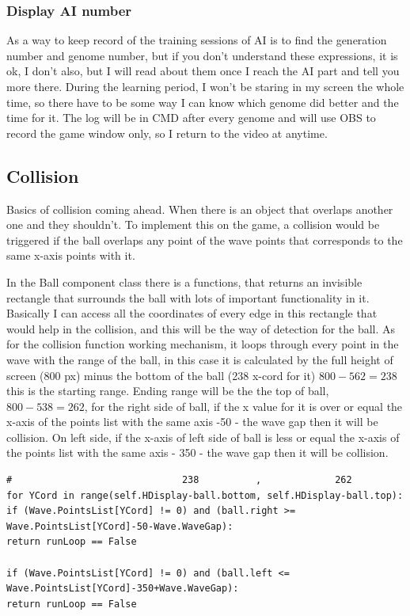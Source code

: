 \subsubsection{ Display AI number}

As a way to keep record of the training sessions of AI is to find the generation number and genome number, but if you don't understand these expressions, it is ok, I don't also, but I will read about them once I reach the AI part and tell you more there. During the learning period, I won't be staring in my screen the whole time, so there have to be some way I can know which genome did better and the time for it. The log will be in CMD after every genome and will use OBS to record the game window only, so I return to the video at anytime.

\subsection{Collision}\label{sec:collision}
Basics of collision coming ahead. When there is an object that overlaps another one and they shouldn't. To implement this on the game, a collision would be triggered if the ball overlaps any point of the wave points that corresponds to the same x-axis points with it.

In the Ball component class there is a  functions, that returns an invisible rectangle that surrounds the ball with lots of important functionality in it. Basically I can access all the coordinates of every edge in this rectangle that would help in the collision, and this will be the way of detection for the ball.
As for the collision function working mechanism, it loops through every point in the wave with the range of the ball, in this case it is  calculated by the full height of screen (800 px) minus the bottom of the ball (238 x-cord for it) $800-562 = 238$ this is the starting range. Ending range will be the the top of ball, $800-538 = 262$, for the right side of ball, if the x value for it is over or equal the x-axis of the points list with the same axis -50 - the wave gap then it will be collision. On left side, if the x-axis of left side of ball is less or equal the x-axis of  the points list with the same axis - 350 - the wave gap then it will be collision. 




\begin{listing}
\begin{verbatim}
#                              238          ,             262
for YCord in range(self.HDisplay-ball.bottom, self.HDisplay-ball.top):
if (Wave.PointsList[YCord] != 0) and (ball.right >= Wave.PointsList[YCord]-50-Wave.WaveGap):
return runLoop == False

if (Wave.PointsList[YCord] != 0) and (ball.left <= Wave.PointsList[YCord]-350+Wave.WaveGap):
return runLoop == False
\end{verbatim}
\end{listing}

